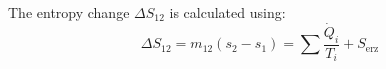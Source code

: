 The entropy change \( \Delta S_{12} \) is calculated using:  
\[
\Delta S_{12} = m_{12} (s_2 - s_1) = \sum \frac{\dot{Q}_i}{T_i} + S_{\text{erz}}
\]